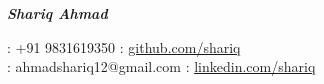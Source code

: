 \documentclass{article}
\begin{document}
\vspace*{-48pt}

\begin{frame}

  \centering \LARGE
  \emph{\textbf{Shariq Ahmad}}\\
\end{frame}
\vspace*{2pt}
\begin{frame}
   \centering
   \hspace{0.5mm}: +91 9831619350
  \hspace{10.05cm}: \href{https://github.com/153079019shariq}{github.com/shariq}\\
  \textbf{}: ahmadshariq12@gmail.com
  \hfill{: \href{https://www.linkedin.com/in/shariq-ahmad-77957991/}{linkedin.com/shariq}}\\
  
\end{frame}
\end{document}
